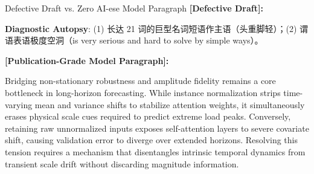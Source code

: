 \begin{ExampleBox}{Defective Draft vs. Zero AI-ese Model Paragraph}
\textbf{\color{TargetHighlight}[Defective Draft]:}\par
{}\par\vspace{4pt}
\textbf{Diagnostic Autopsy}: (1)  长达 21 词的巨型名词短语作主语（头重脚轻）；(2)  谓语表语极度空洞（is very serious and hard to solve by simple ways）。\par\vspace{6pt}
\textbf{\color{AcadNavy}[Publication-Grade Model Paragraph]:}\par
Bridging non-stationary robustness and amplitude fidelity remains a core bottleneck in long-horizon forecasting. While instance normalization strips time-varying mean and variance shifts to stabilize attention weights, it simultaneously erases physical scale cues required to predict extreme load peaks. Conversely, retaining raw unnormalized inputs exposes self-attention layers to severe covariate shift, causing validation error to diverge over extended horizons. Resolving this tension requires a mechanism that disentangles intrinsic temporal dynamics from transient scale drift without discarding magnitude information.
\end{ExampleBox}
